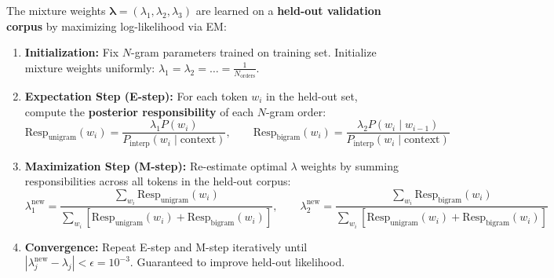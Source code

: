 \documentclass[10pt,a4paper]{article}
\begin{document}
\vspace{-2pt}

\begin{insightbox}[title={\bfseries\sffamily The Expectation-Maximization (EM) Algorithm for Mixture Weights (Lab 3 Exercise 5)}]
\footnotesize
The mixture weights $\boldsymbol{\lambda} = (\lambda_1, \lambda_2, \lambda_3)$ are learned on a \textbf{held-out validation corpus} by maximizing log-likelihood via EM:
\begin{enumerate}[leftmargin=14pt, itemsep=0.5pt, parsep=0pt, topsep=0.5pt]
    \item \textbf{Initialization:} Fix $N$-gram parameters trained on training set. Initialize mixture weights uniformly: $\lambda_1 = \lambda_2 = \dots = \frac{1}{N_{\text{orders}}}$.
    \item \textbf{Expectation Step (E-step):} For each token $w_i$ in the held-out set, compute the \textbf{posterior responsibility} of each $N$-gram order:
    \[
    \text{Resp}_{\text{unigram}}(w_i) = \frac{\lambda_1 P(w_i)}{P_{\text{interp}}(w_i \mid \text{context})}, \qquad \text{Resp}_{\text{bigram}}(w_i) = \frac{\lambda_2 P(w_i \mid w_{i-1})}{P_{\text{interp}}(w_i \mid \text{context})}
    \]
    \item \textbf{Maximization Step (M-step):} Re-estimate optimal $\lambda$ weights by summing responsibilities across all tokens in the held-out corpus:
    \[
    \lambda_1^{\text{new}} = \frac{\sum_{w_i} \text{Resp}_{\text{unigram}}(w_i)}{\sum_{w_i} [\text{Resp}_{\text{unigram}}(w_i) + \text{Resp}_{\text{bigram}}(w_i)]}, \qquad \lambda_2^{\text{new}} = \frac{\sum_{w_i} \text{Resp}_{\text{bigram}}(w_i)}{\sum_{w_i} [\text{Resp}_{\text{unigram}}(w_i) + \text{Resp}_{\text{bigram}}(w_i)]}
    \]
    \item \textbf{Convergence:} Repeat E-step and M-step iteratively until $|\lambda_j^{\text{new}} - \lambda_j| < \epsilon = 10^{-3}$. Guaranteed to improve held-out likelihood.
\end{enumerate}
\end{insightbox}

\newpage

\end{document}
